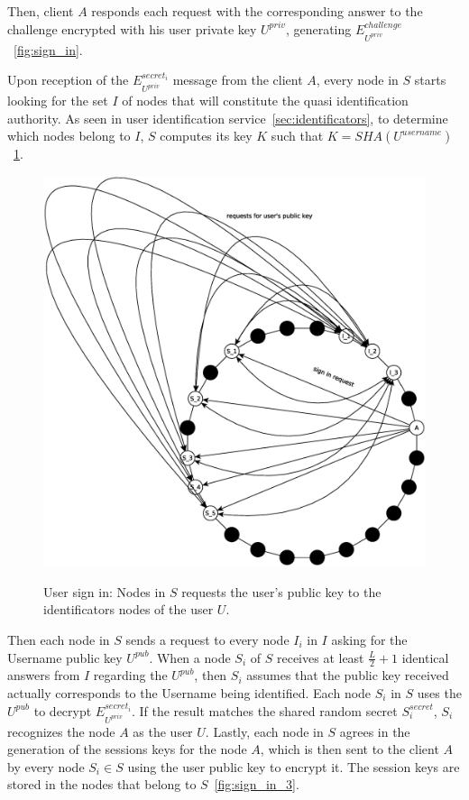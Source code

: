 Then, client $A$ responds each request with the corresponding answer to the
challenge encrypted with his user private key $U^{priv}$, generating
$E^{challenge}_{U^{priv}}$~\ref{fig:sign_in}. 

Upon reception of the $E^{secret_i}_{U^{priv}}$ message from the client $A$, every node in $S$
starts looking for the set $I$ of nodes that will constitute the quasi
identification authority. As seen in user identification service~\ref{sec:identificators}, to
determine which nodes belong to $I$, $S$ computes
its key $K$ such that $K = SHA(U^{username})$~\ref{fig:sign_in_2}.

\begin{figure}[!htb]
\centering
\includegraphics[width=14cm]{../img/sign_in_2}\\
\caption{User sign in: Nodes in $S$ requests the user's public key to the
identificators nodes of the user $U$.}
\label{fig:sign_in_2}
\end{figure}

Then each node in $S$ sends a request to every node $I_i$ in $I$ asking for the Username public key $U^{pub}$. When a node
$S_i$ of $S$ receives at least $\frac{L}{2} + 1$ identical answers from
$I$ regarding the $U^{pub}$, then $S_i$ assumes that the public key received
actually corresponds to the Username being identified. Each node $S_i$ in $S$
uses the $U^{pub}$ to decrypt $E^{secret_i}_{U^{priv}}$. If the result matches
the shared random secret $S^{secret}_i$, $S_i$ recognizes the node $A$ as the
user $U$.
Lastly, each node in $S$ agrees in the generation of the sessions keys for the
node $A$, which is then sent to the client $A$ by every node $S_i \in S$ using
the user public key to encrypt it. The session keys are stored in the
nodes that belong to $S$~\ref{fig:sign_in_3}.


